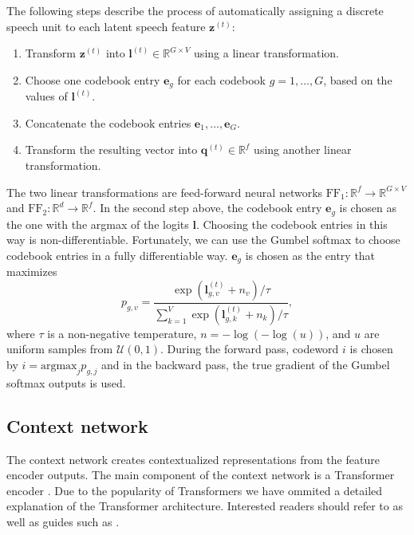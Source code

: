 The following steps describe the process of automatically assigning a discrete speech unit to each latent speech feature $\mathbf{z}^{(t)}$:
\begin{enumerate}
    \item Transform $\mathbf{z}^{(t)}$ into $\mathbf{l}^{(t)} \in \mathbb{R}^{G \times V}$ using a linear transformation.
    \item Choose one codebook entry $\mathbf{e}_g$ for each codebook $g = 1, \dots, G$, based on the values of $\mathbf{l}^{(t)}$.
    \item Concatenate the codebook entries $\mathbf{e}_1, \dots, \mathbf{e}_G$.
    \item Transform the resulting vector into $\mathbf{q}^{(t)} \in \mathbb{R}^{f}$ using another linear transformation.
\end{enumerate}
The two linear transformations are feed-forward neural networks $\text{FF}_1: \mathbb{R}^{f} \rightarrow \mathbb{R}^{G \times V}$ and $\text{FF}_2: \mathbb{R}^{d} \rightarrow \mathbb{R}^{f}$.
In the second step above, the codebook entry $\mathbf{e}_g$ is chosen as the one with the argmax of the logits $\mathbf{l}$. Choosing the codebook entries in this way is non-differentiable.
Fortunately, we can use the Gumbel softmax to choose codebook entries in a fully differentiable way. 
$\mathbf{e}_g$ is chosen as the entry that maximizes
\begin{equation}
    p_{g, v} = \dfrac{\exp{\left(\mathbf{l}^{(t)}_{g, v} + n_v\right)}/\tau}{\sum\limits_{k=1}^{V} \exp{\left(\mathbf{l}^{(t)}_{g, k} + n_k\right)}/\tau},
\end{equation}
where $\tau$ is a non-negative temperature, $n = -\log{(-\log{(u)})}$, and $u$ are uniform samples from $\mathcal{U}(0, 1)$.
During the forward pass, codeword $i$ is chosen by $i = \text{argmax}_j p_{g,j}$ and in the backward pass, the true gradient of the Gumbel softmax outputs is used.



\subsection{Context network}
The context network creates contextualized representations from the feature encoder outputs.
The main component of the context network is a Transformer encoder \cite{transformer}.
Due to the popularity of Transformers we have ommited a detailed explanation of the Transformer architecture. 
Interested readers should refer to \cite{transformer} as well as guides such as \cite{alammar2018illustrated}.

